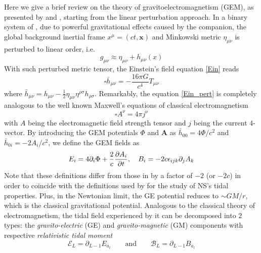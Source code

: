 Here we give a brief review on the theory of gravitoelectromagnetism (\gls{GEM}), as presented by \cite{mashhoon2003gravitoelectromagnetism} and \cite{damour2009relativistic}, starting from the linear perturbation approach. In a binary system of , due to powerful gravitational effects caused by the companion, the global background inertial frame $x^{\mu} = (ct, \mathbf{x})$ and Minkowski metric $\eta_{\mu\nu}$ is perturbed to linear order, i.e.
\begin{equation}
    g_{\mu\nu} \approx \eta_{\mu\nu} + h_{\mu\nu}(x)
\end{equation}
With such perturbed metric tensor, the Einstein's field equation \eqref{Ein} reads
\begin{equation}
    \square \bar{h}_{\mu\nu} = - \frac{16\pi G}{c^4} T_{\mu\nu} \label{Ein_pert}
\end{equation}
where $\bar{h}_{\mu\nu} = h_{\mu\nu} - \frac{1}{2} \eta_{\mu\nu}\eta^{\rho\sigma}h_{\rho\sigma}$. Remarkably, the equation \eqref{Ein_pert} is completely analogous to the well known Maxwell's equations of classical electromagnetism
\begin{equation}
    \square A^\nu = 4\pi j^\nu
\end{equation}
with $A$ being the electromagnetic field strength tensor and $j$ being the current 4-vector. By introducing the \gls{GEM} potentials $\Phi$ and $\mathbf{A}$ as $\bar{h}_{00}=4\Phi/c^2$ and $\bar{h}_{0i} = -2A_i/c^2$, we define the \gls{GEM} fields as
\begin{equation}
    E_{i} = 4\partial_i\Phi + \frac{2}{c} \pdv{A_i}{t},\quad B_i = -2c\epsilon_{ijk}\partial_j A_k
\end{equation}
Note that these definitions differ from those in \cite{mashhoon2003gravitoelectromagnetism} by a factor of $-2$ (or $-2c$) in order to coincide with the definitions used by \cite{damour2009relativistic} for the study of \gls{NS}'s tidal properties. Plus, in the Newtonian limit, the \gls{GE} potential reduces to $\sim GM/r$, which is the classical gravitational potential. Analogous to the classical theory of electromagnetism, the tidal field experienced by it can be decomposed into 2 types: the \emph{gravito-electric} (\gls{GE}) and \emph{gravito-magnetic} (\gls{GM}) components with respective \emph{relativistic tidal moment} \citep{damour2009relativistic}
\begin{equation}
        \mathcal{E}_L = \partial_{L-1} E_{a_l} \qquad\text{and}\qquad \mathcal{B}_L = \partial_{L-1} B_{a_l}
\end{equation}
